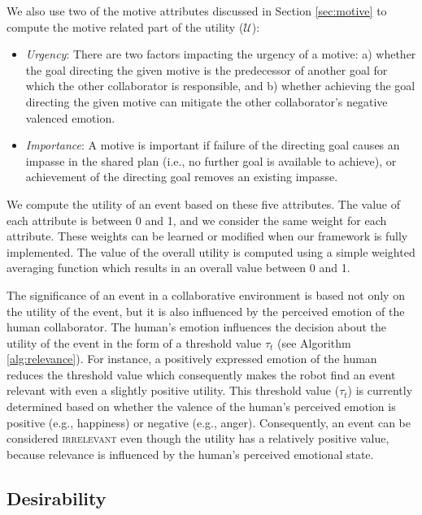 \documentclass{article}
\begin{document}
\noindent We also use two of the motive attributes discussed in Section
\ref{sec:motive} to compute the motive related part of the utility
($\mathcal{U}$):

\begin{itemize}[leftmargin=2pt]
  \setlength\itemsep{1mm}
  \item \textit{Urgency}: There are two factors impacting the urgency of
  a motive: a) whether the goal directing the given motive is the predecessor of
  another goal for which the other collaborator is responsible, and b) whether
  achieving the goal directing the given motive can mitigate the other
  collaborator's negative valenced emotion.
  \item \textit{Importance}: A motive is important if failure of the directing
  goal causes an impasse in the shared plan (i.e., no further goal is available
  to achieve), or achievement of the directing goal removes an existing impasse.
\end{itemize}

We compute the utility of an event based on these five attributes. The value of
each attribute is between 0 and 1, and we consider the same weight for each
attribute. These weights can be learned or modified when our framework is fully
implemented. The value of the overall utility is computed using a simple
weighted averaging function which results in an overall value between 0 and 1.

The significance of an event in a collaborative environment is based not
only on the utility of the event, but it is also influenced by the perceived
emotion of the human collaborator. The human's emotion influences the decision
about the utility of the event in the form of a threshold value $\tau_{t}$ (see
Algorithm \ref{alg:relevance}). For instance, a positively expressed emotion of
the human reduces the threshold value which consequently makes the robot find an
event relevant with even a slightly positive utility. This threshold value
($\tau_{t}$) is currently determined based on whether the valence of the
human's perceived emotion is positive (e.g., happiness) or negative (e.g.,
anger). Consequently, an event can be considered \textsc{irrelevant} even though
the utility has a relatively positive value, because relevance is influenced by
the human's perceived emotional state.

\vspace*{-1mm}
\subsection{Desirability}
\end{document}
